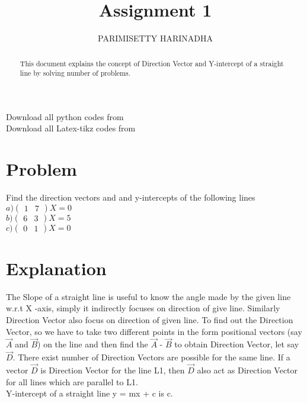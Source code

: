 \documentclass[journal,12pt,twocolumn]{IEEEtran}
\title{Assignment 1}
\author{PARIMISETTY HARINADHA }
\begin{document}
\maketitle
\newpage
\begin{abstract}
This document explains the concept of Direction Vector and Y-intercept of a straight line by solving number of problems.
\end{abstract}
Download all python codes from 
 \\
\newline
Download all Latex-tikz codes from 
 \par

\section{Problem}
Find the direction vectors and and y-intercepts of the following lines \\
\newline
$
a) \begin{pmatrix} 
	1 & 7 
\end{pmatrix} X = 0
$
\\
$
b) \begin{pmatrix} 6 & 3
\end{pmatrix} X = 5
$
\\
$
c) \begin{pmatrix} 0 & 1 
\end{pmatrix} X = 0
$
\section{Explanation}
The Slope of a straight line is useful to know the angle made by the given line w.r.t X -axis, simply it indirectly focuses on direction of give line. Similarly Direction Vector also focus on direction of given line. To find out the Direction Vector, so we have to take two different points in the form positional vectors (say $\overrightarrow{A}$ and $\overrightarrow{B}$) on the line and then find the $\overrightarrow{A}$ - $\overrightarrow{B}$ to obtain Direction Vector, let say $\overrightarrow{D}$. There exist number of Direction Vectors are possible for the same line. If a vector $\overrightarrow{D}$ is Direction Vector for the line L1, then $\overrightarrow{D}$ also act as Direction Vector for all lines which are parallel to L1.
\\
Y-intercept of a straight line y = mx + c is c.
\\
\\
\end{document}
